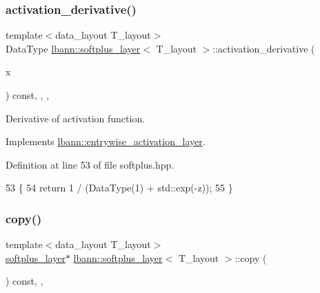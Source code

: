 \subsubsection{\texorpdfstring{activation\+\_\+derivative()}{activation\_derivative()}}
{\footnotesize\ttfamily template$<$data\+\_\+layout T\+\_\+layout$>$ \\
Data\+Type \hyperlink{classlbann_1_1softplus__layer}{lbann\+::softplus\+\_\+layer}$<$ T\+\_\+layout $>$\+::activation\+\_\+derivative (\begin{DoxyParamCaption}\item[{Data\+Type}]{x }\end{DoxyParamCaption}) const\hspace{0.3cm}{\ttfamily [inline]}, {\ttfamily [override]}, {\ttfamily [protected]}, {\ttfamily [virtual]}}

Derivative of activation function. 

Implements \hyperlink{classlbann_1_1entrywise__activation__layer_a7676a4c5060452a38264993554e79f8e}{lbann\+::entrywise\+\_\+activation\+\_\+layer}.



Definition at line 53 of file softplus.\+hpp.


\begin{DoxyCode}
53                                                             \{
54     \textcolor{keywordflow}{return} 1 / (DataType(1) + std::exp(-z));
55   \}
\end{DoxyCode}
\mbox{\label{classlbann_1_1softplus__layer_aef624d9020d403f6a19da8742ec9c1d2}} 
\subsubsection{\texorpdfstring{copy()}{copy()}}
{\footnotesize\ttfamily template$<$data\+\_\+layout T\+\_\+layout$>$ \\
\hyperlink{classlbann_1_1softplus__layer}{softplus\+\_\+layer}$\ast$ \hyperlink{classlbann_1_1softplus__layer}{lbann\+::softplus\+\_\+layer}$<$ T\+\_\+layout $>$\+::copy (\begin{DoxyParamCaption}{ }\end{DoxyParamCaption}) const\hspace{0.3cm}{\ttfamily [inline]}, {\ttfamily [override]}, {\ttfamily [virtual]}}

